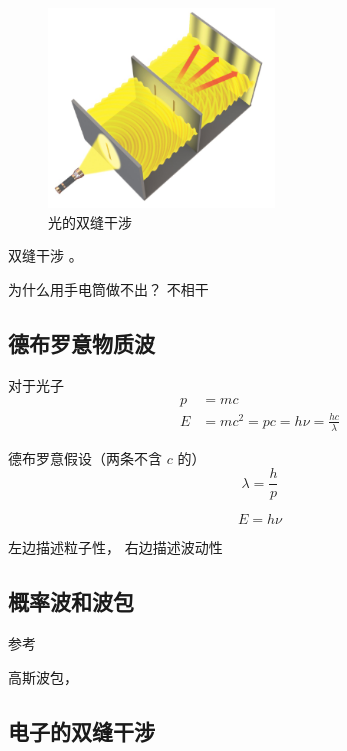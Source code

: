 \begin{figure}[ht]
\centering
\includegraphics[width=6cm]{./figures/QMIntr5.png}
\caption{光的双缝干涉} \label{QMIntr_fig5}
\end{figure}

双缝干涉 。

为什么用手电筒做不出？ 不相干

\subsection{德布罗意物质波}

对于光子
\begin{equation}
\begin{aligned}
p &= mc
\\
E &= mc^2 = pc = h\nu = \frac{hc}{\lambda}
\end{aligned}
\end{equation}

德布罗意假设（两条不含 $c$ 的）
\begin{equation}
\lambda = \frac{h}{p}
\end{equation}

\begin{equation}
E = h\nu
\end{equation}

左边描述粒子性， 右边描述波动性

\subsection{概率波和波包}
参考

高斯波包， 

\subsection{电子的双缝干涉}

